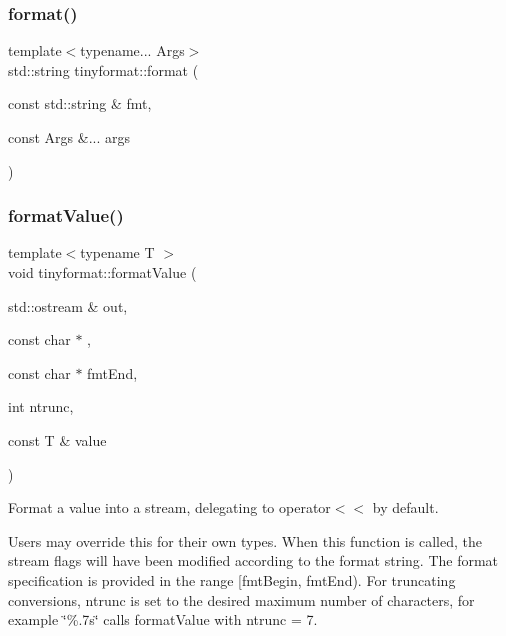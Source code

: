 \mbox{\label{namespacetinyformat_a8cc0453726f12eef65695df89b872336}} 
\subsubsection{\texorpdfstring{format()}{format()}\hspace{0.1cm}{\footnotesize\ttfamily [3/3]}}
{\footnotesize\ttfamily template$<$typename... Args$>$ \\
std\+::string tinyformat\+::format (\begin{DoxyParamCaption}\item[{const std\+::string \&}]{fmt,  }\item[{const Args \&...}]{args }\end{DoxyParamCaption})}

\mbox{\label{namespacetinyformat_a875b4e4f642b74394598804a1b012f9d}} 
\subsubsection{\texorpdfstring{format\+Value()}{formatValue()}}
{\footnotesize\ttfamily template$<$typename T $>$ \\
void tinyformat\+::format\+Value (\begin{DoxyParamCaption}\item[{std\+::ostream \&}]{out,  }\item[{const char $\ast$}]{,  }\item[{const char $\ast$}]{fmt\+End,  }\item[{int}]{ntrunc,  }\item[{const T \&}]{value }\end{DoxyParamCaption})\hspace{0.3cm}{\ttfamily [inline]}}

Format a value into a stream, delegating to operator$<$$<$ by default.

Users may override this for their own types. When this function is called, the stream flags will have been modified according to the format string. The format specification is provided in the range \mbox{[}fmt\+Begin, fmt\+End). For truncating conversions, ntrunc is set to the desired maximum number of characters, for example \char`\"{}\%.\+7s\char`\"{} calls format\+Value with ntrunc = 7.

